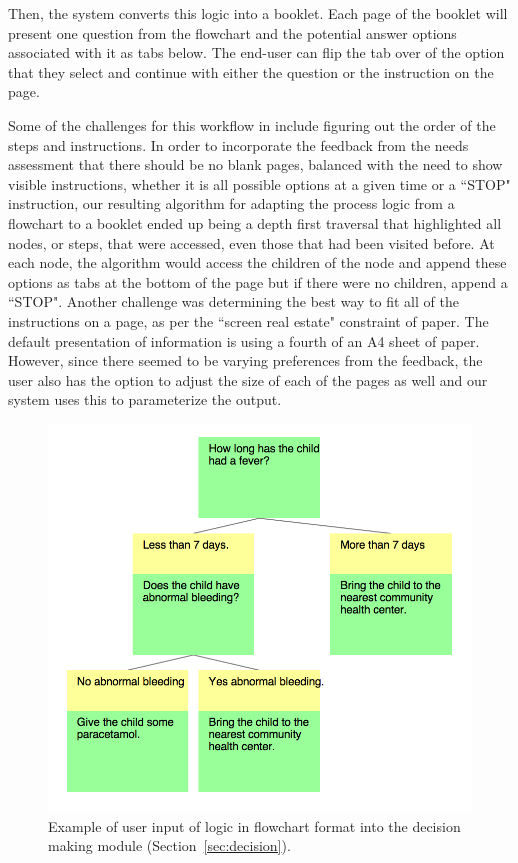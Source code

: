 \documentclass{sig-alternate}
\begin{document}
Then, the system converts this logic into a booklet. Each page of the booklet will present one question from the flowchart and the potential answer options associated with it as tabs below. The end-user can flip the tab over of the option that they select and continue with either the question or the instruction on the page.

Some of the challenges for this workflow in \nifty include figuring out the order of the steps and instructions. In order to incorporate the feedback from the needs assessment that there should be no blank pages, balanced with the need to show visible instructions, whether it is all possible options at a given time or a ``STOP" instruction, our resulting algorithm for adapting the process logic from a flowchart to a booklet ended up being a depth first traversal that highlighted all nodes, or steps, that were accessed, even those that had been visited before. At each node, the algorithm would access the children of the node and append these options as tabs at the bottom of the page but if there were no children, append a ``STOP". Another challenge was determining the best way to fit all of the instructions on a page, as per the ``screen real estate" constraint of paper. The default presentation of information is using a fourth of an A4 sheet of paper. However, since there seemed to be varying preferences from the feedback, the user also has the option to adjust the size of each of the pages as well and our system uses this to parameterize the output.


\begin{figure}
\centering
\includegraphics[width=.6\linewidth]{img/flowchart-input.png}
\caption{Example of user input of logic in flowchart format into the decision making module (Section~\ref{sec:decision}).}
\label{fig:flowchart-input}
\end{figure}
\end{document}
